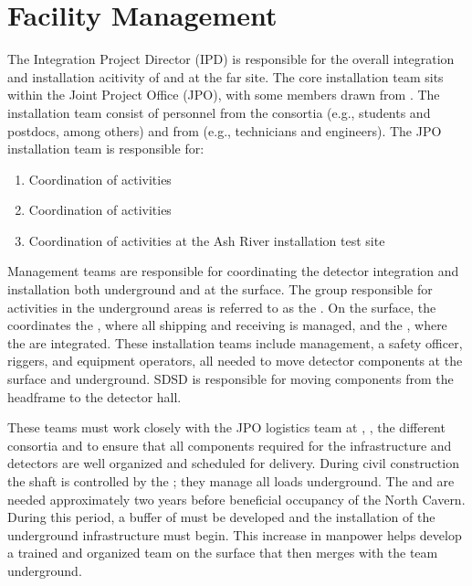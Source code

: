 \chapter{Facility Management}
\label{vl:tc-facility_mgmt}

The Integration Project Director (IPD) is responsible for the overall
integration and installation acitivity of  and
 at the far site. The core installation team sits within
the Joint Project Office (JPO), with some members drawn from
. The installation team consist of personnel from the consortia (e.g.,
students and postdocs, among others) and from  (e.g.,
technicians and engineers). The JPO installation team is responsible for:
\begin{enumerate}
 \item Coordination of activities \surf
 \item Coordination of activities 
 \item Coordination of activities at the Ash River installation
   test site
\end{enumerate}

Management teams are responsible for coordinating the detector
integration and installation both underground and at the surface. The
group responsible for activities in the underground areas is referred
to as the .  On the surface, the  coordinates
the , where all  shipping and receiving is
managed, and the , where the  are integrated.
These installation teams include management, a safety officer,
riggers, and equipment operators, all needed to move detector
components at the surface and underground. SDSD
is responsible for moving components from the headframe to the
detector hall.

These teams must work closely with the JPO logistics team at
\surf, , the different consortia and  to
ensure that all components required for the infrastructure and
detectors are well organized and scheduled for delivery. During
civil construction the shaft is controlled by the ; they manage all loads
underground.  The  and  are
needed approximately two years before beneficial occupancy of the North
Cavern.  During this period, a buffer of  must be developed 
and  the installation of the underground infrastructure must begin. This
increase in manpower helps develop a trained and organized team on the
surface that then merges with the team underground.


